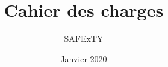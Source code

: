 \documentclass[16pt]{article}
\title{\Huge Cahier des charges}
\author{SAFExTY}
\date{Janvier 2020}
\begin{document}
\maketitle
\pagebreak

\tableofcontents



\end{document}
